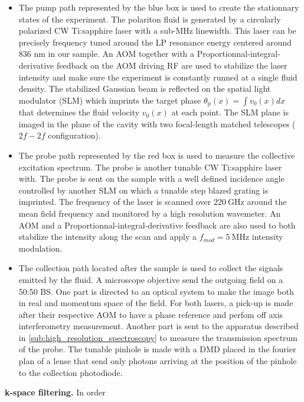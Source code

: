  \begin{itemize}
    \item The pump path represented by the blue box is used to create the stationnary states of the experiment. The polariton fluid is generated by a circularly polarized CW Ti:sapphire laser with a sub-MHz linewidth. This laser can be precisely frequency tuned around the LP resonance energy centered around 836 nm in our sample. An AOM 
    together with a Proportionnal-integral-derivative feedback on the AOM driving RF are used to stabilize the laser intensity and make sure the experiment is constantly runned at a single fluid density.
    The stabilized Gaussian beam is reflected on the spatial light modulator (SLM) which imprints the target phase $\theta_\mathrm{p}(x)=\int v_0(x)dx$ that determines the fluid velocity $v_0(x)$ at each point. The SLM plane is imaged in the plane of the cavity with two focal-length matched telescopes ($2f-2f$ configuration).
    \item The probe path represented by the red box is used to measure the collective excitation spectrum. The probe is another tunable CW Ti:sapphire laser with. The probe is sent on the sample with a well defined incidence angle controlled by another SLM on which a tunable step blazed grating is imprinted. The frequency of
    the laser is scanned over $\SI{220}{\giga\hertz}$ around the mean field frequency and monitored by a high resolution wavemeter. An AOM and a Proportionnal-integral-derivative feedback are also used to both stabilize the intensity along the scan and apply a $f_{mod}=\SI{5}{\mega\hertz}$ intensity modulation.
    \item The collection path located after the sample is used to collect the signals emitted by the fluid. A microscope objective send the outgoing field on a 50:50 BS. One part is directed to an optical system to make the image both in real and momentum space of the field. For both lasers, a pick-up is made after their respective AOM to have a phase reference and perfom off axis interferometry measurement. Another part is sent to the apparatus described in \autoref{sub:high_resolution_spectroscopy} to measure the transmission spectrum of the probe. The tunable
    pinhole is made with a DMD placed in the fourier plan of a lense that send only photons arriving at the position of the pinhole to the collection photodiode.
 \end{itemize}

\textbf{k-space filtering.} In order


